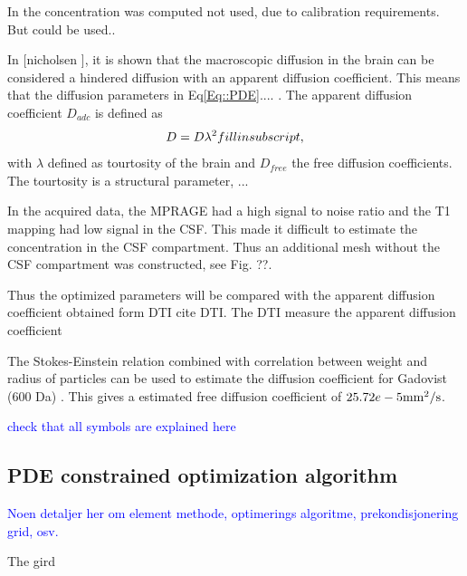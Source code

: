 \documentclass[11pt,a4paper]{article}
\newcommand{\kam}[1]{\textcolor{blue}{#1}}
\begin{document}
In \cite{XU2011827} the concentration was computed {\color{red} not used, due to calibration requirements. But could be used.}. 

In [nicholsen ], it is shown that the macroscopic diffusion in the brain can be considered a hindered diffusion with an apparent diffusion coefficient. This means that the diffusion parameters in Eq\ref{Eq::PDE}.... . The apparent diffusion coefficient  $D_{adc}$ is defined as 
\begin{equation}
D = D \lambda\sp{2} fill in subscript,
\end{equation} 
with $\lambda$ defined as tourtosity of the brain and $D_{free}$ the free diffusion coefficients.  The tourtosity is a structural parameter, ...


In the acquired data, the MPRAGE had a high signal to noise ratio and the T1 mapping had low signal in the CSF. This made it difficult to estimate the concentration in the CSF compartment. Thus an additional mesh without the CSF compartment was constructed, see Fig. ??.     


Thus the optimized parameters will be compared with the apparent diffusion coefficient obtained form DTI cite DTI. The DTI measure the apparent diffusion coefficient 


The Stokes-Einstein relation combined with correlation between weight and radius of particles can be used to estimate the diffusion coefficient for Gadovist (600 Da) \cite{VALENCIA2011129}. This gives a estimated free diffusion coefficient of 
$  25.72 e-5 \mathrm{mm\sp{2}/s}$. 





\kam{check that all symbols are explained here}






\subsection{PDE constrained optimization algorithm} 

\kam{
Noen detaljer her om element methode, optimerings algoritme, prekondisjonering
grid, osv. 
}


The gird 
\end{document}
